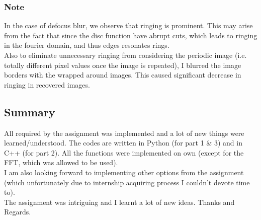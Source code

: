 \documentclass{article}
\begin{document}
    \subsubsection*{Note}
    In the case of defocus blur, we observe that ringing is prominent. This may arise from the fact that since the disc function have abrupt cuts, which leads to ringing in the fourier domain, and thus edges resonates rings.\\
    Also to eliminate unnecessary ringing from considering the periodic image (i.e. totally different pixel values once the image is repeated), I blurred the image borders with the wrapped around images. This caused significant decrease in ringing in recovered images.
    \pagebreak


    \subsection*{Summary}
    All required by the assignment was implemented and a lot of new things were learned/understood. The codes are written in Python (for part 1 \& 3) and in C++ (for part 2). All the functions were implemented on own (except for the FFT, which was allowed to be used). \\
    I am also looking forward to implementing other options from the assignment (which unfortunately due to internship acquiring process I couldn't devote time to).\\
    The assignment was intriguing and I learnt a lot of new ideas. Thanks and Regards.
    
\end{document}
